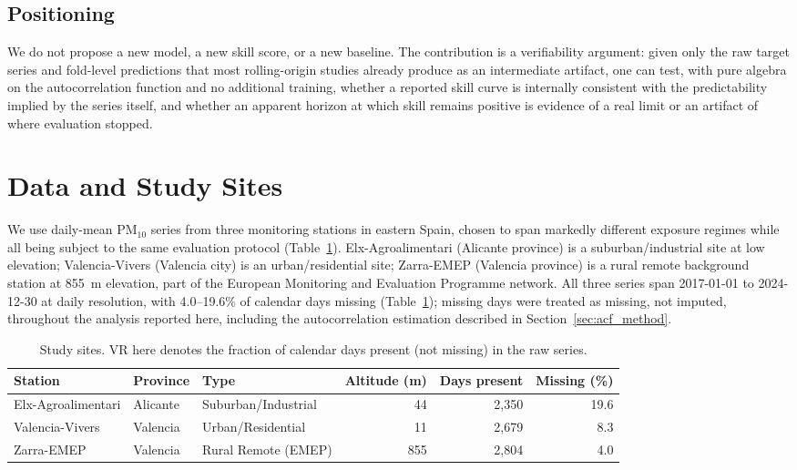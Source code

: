 \documentclass{article}
\begin{document}
\subsection{Positioning}

We do not propose a new model, a new skill score, or a new baseline.
The contribution is a verifiability argument: given only the raw target series
and fold-level predictions that most rolling-origin studies already produce
as an intermediate artifact, one can test, with pure algebra on the
autocorrelation function and no additional training, whether a reported skill
curve is internally consistent with the predictability implied by the series
itself, and whether an apparent horizon at which skill remains positive is
evidence of a real limit or an artifact of where evaluation stopped.

\section{Data and Study Sites}
\label{sec:data}

We use daily-mean PM$_{10}$ series from three monitoring stations in eastern
Spain, chosen to span markedly different exposure regimes while all being
subject to the same evaluation protocol (Table~\ref{tab:sites}).
Elx-Agroalimentari (Alicante province) is a suburban/industrial site at low
elevation; Valencia-Vivers (Valencia city) is an urban/residential site;
Zarra-EMEP (Valencia province) is a rural remote background station at
\SI{855}{\meter} elevation, part of the European Monitoring and Evaluation
Programme network.
All three series span 2017-01-01 to 2024-12-30 at daily resolution, with
4.0--19.6\% of calendar days missing (Table~\ref{tab:sites}); missing days
were treated as missing, not imputed, throughout the analysis reported here,
including the autocorrelation estimation described in
Section~\ref{sec:acf_method}.

\begin{table}[t]
\centering
\small
\caption{Study sites. VR here denotes the fraction of calendar days present
  (not missing) in the raw series.}
\label{tab:sites}
\begin{tabular}{@{}lllrrr@{}}
\toprule
Station & Province & Type & Altitude (m) & Days present & Missing (\%) \\
\midrule
Elx-Agroalimentari & Alicante & Suburban/Industrial & 44  & 2{,}350 & 19.6 \\
Valencia-Vivers     & Valencia & Urban/Residential   & 11  & 2{,}679 & 8.3 \\
Zarra-EMEP          & Valencia & Rural Remote (EMEP) & 855 & 2{,}804 & 4.0 \\
\bottomrule
\end{tabular}
\end{table}
\end{document}
